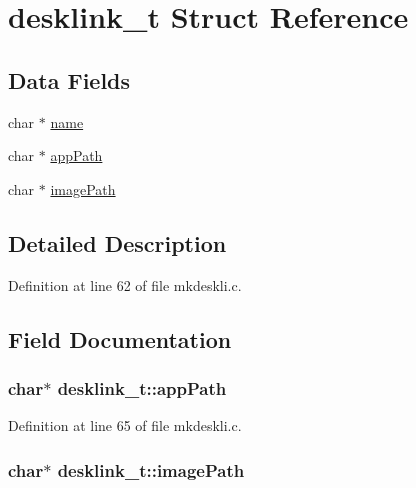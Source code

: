 \hypertarget{structdesklink__t}{\section{desklink\-\_\-t Struct Reference}
\label{structdesklink__t}
}
\subsection*{Data Fields}
\begin{DoxyCompactItemize}
\item 
char $\ast$ \hyperlink{structdesklink__t_a29e2e7839d78d38bd387ce12badd177c}{name}
\item 
char $\ast$ \hyperlink{structdesklink__t_a5ea7988f8454a870a67194a0953c29c0}{app\-Path}
\item 
char $\ast$ \hyperlink{structdesklink__t_a803da26f74414988a94c5b0473a27ef5}{image\-Path}
\end{DoxyCompactItemize}


\subsection{Detailed Description}


Definition at line 62 of file mkdeskli.\-c.



\subsection{Field Documentation}
\hypertarget{structdesklink__t_a5ea7988f8454a870a67194a0953c29c0}{
\subsubsection[{app\-Path}]{\setlength{\rightskip}{0pt plus 5cm}char$\ast$ desklink\-\_\-t\-::app\-Path}}\label{structdesklink__t_a5ea7988f8454a870a67194a0953c29c0}


Definition at line 65 of file mkdeskli.\-c.

\hypertarget{structdesklink__t_a803da26f74414988a94c5b0473a27ef5}{
\subsubsection[{image\-Path}]{\setlength{\rightskip}{0pt plus 5cm}char$\ast$ desklink\-\_\-t\-::image\-Path}}\label{structdesklink__t_a803da26f74414988a94c5b0473a27ef5}


